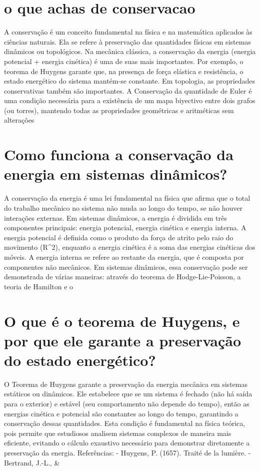 \documentclass[11pt,a4paper]{article}
\begin{document}
\section{o que achas de conservacao}
A conservação é um conceito fundamental na física e na matemática aplicados às ciências naturais. Ela se refere à preservação das quantidades físicas em sistemas dinâmicos ou topológicos. Na mecânica clássica, a conservação da energia (energia potencial + energia cinética) é uma de suas mais importantes. Por exemplo, o teorema de Huygens garante que, na presença de força elástica e resistência, o estado energético do sistema mantém-se constante. Em topologia, as propriedades conservativas também são importantes. A Conservação da quantidade de Euler é uma condição necessária para a existência de um mapa biyectivo entre dois grafos (ou torres), mantendo todas as propriedades geométricas e aritméticas sem alterações

\section{Como funciona a conservação da energia em sistemas dinâmicos?}
A conservação da energia é uma lei fundamental na física que afirma que o total do trabalho mecânico no sistema não muda ao longo do tempo, se não houver interações externas. Em sistemas dinâmicos, a energia é dividida em três componentes principais: energia potencial, energia cinética e energia interna. A energia potencial é definida como o produto da força de atrito pelo raio do movimento (R^2), enquanto a energia cinética é a soma das energias cinéticas dos móveis. A energia interna se refere ao restante da energia, que é composta por componentes não mecânicos. Em sistemas dinâmicos, essa conservação pode ser demonstrada de várias maneiras: através do teorema de Hodge-Lie-Poisson, a teoria de Hamilton e o

\section{O que é o teorema de Huygens, e por que ele garante a preservação do estado energético?}
O Teorema de Huygens garante a preservação da energia mecânica em sistemas estáticos ou dinâmicos. Ele estabelece que se um sistema é fechado (não há saída para o exterior) e estável (seu comportamento não depende do tempo), então as energias cinética e potencial são constantes ao longo do tempo, garantindo a conservação dessas quantidades. Esta condição é fundamental na física teórica, pois permite que estudiosos analisem sistemas complexos de maneira mais eficiente, evitando o cálculo exaustivo necessário para demonstrar diretamente a preservação da energia. Referências: - Huygens, P. (1657). Traité de la lumière. - Bertrand, J.-L., \&
\end{document}
